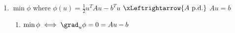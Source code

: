 \documentclass[10pt]{extarticle}
\begin{document}
\begin{minipage}[t][0.5\textheight][t]{\textwidth}
\begin{multicols}{2}
\begin{enumerate}
	\item $\min\phi$ where $\phi(u)=\frac{1}{2}u^TAu-b^Tu$ $\xLeftrightarrow{A \text{ p.d.}}$ $Au=b$
	\begin{enumerate}
		\item $\min\phi \iff \grad_u\phi=0=Au-b$
	\end{enumerate}
\end{enumerate}
\end{multicols}
\end{minipage}
\end{document}
